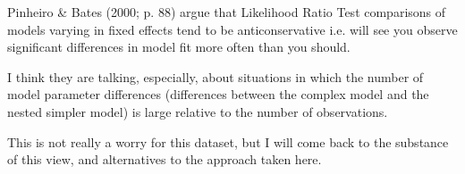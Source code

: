 

Pinheiro & Bates (2000; p. 88) argue that Likelihood Ratio Test comparisons of models varying in fixed effects tend to be anticonservative i.e. 
will see you observe significant differences in model fit more often than you should. 

I think they are talking, especially, about situations in which the number of model parameter differences (differences between the complex model and 
the nested simpler model) is large relative to the number of observations. 

This is not really a worry for this dataset, but I will come back to the substance of this view, and alternatives to the approach taken here.

